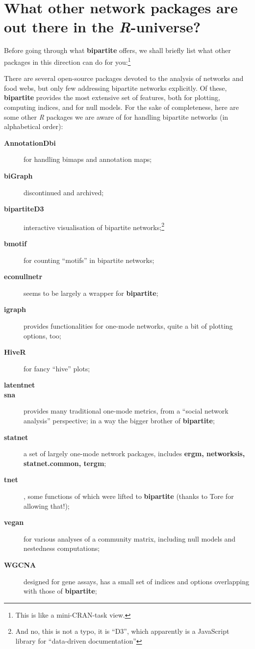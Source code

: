 \documentclass[a4paper, 11pt]{article}\usepackage[]{graphicx}\usepackage[]{color}
\newcommand{\package}[1]{\textbf{#1}}
\newcommand{\proglang}[1]{\textsl{#1}}
\begin{document}
\section{What other network packages are out there in the \proglang{R}-universe?}
Before going through what \package{bipartite} offers, we shall briefly list what other packages in this direction can do for you:\footnote{ This is like a mini-CRAN-task view.}

There are several open-source packages devoted to the analysis of networks and food webs, but only few addressing bipartite networks explicitly. Of these, \package{bipartite} provides the most extensive set of features, both for plotting, computing indices, and for null models. For the sake of completeness, here are some other \proglang{R} packages we are aware of for handling bipartite networks (in alphabetical order):
\begin{description}
\item[\package{AnnotationDbi}] for handling bimaps and annotation maps;
\item[\package{biGraph}] discontinued and archived;
\item[\package{bipartiteD3}] interactive visualisation of bipartite networks;\footnote{And no, this is not a typo, it is ``D3'', which apparently is a JavaScript library for ``data-driven documentation''}
\item[\package{bmotif}] for counting ``motifs'' in bipartite networks; 
\item[\package{econullnetr}] seems to be largely a wrapper for \package{bipartite};
\item[\package{igraph}] provides functionalities for one-mode networks, quite a bit of plotting options, too;
\item[\package{HiveR}] for fancy ``hive'' plots;
\item[\package{latentnet}] 
\item[\package{sna}] provides many traditional one-mode metrics, from a ``social network analysis'' perspective; in a way the bigger brother of \package{bipartite};
\item[\package{statnet}] a set of largely one-mode network packages, includes \package{ergm, networksis, statnet.common, tergm};
\item[\package{tnet}], some functions of which were lifted to \package{bipartite} (thanks to Tore for allowing that!);
\item[\package{vegan}] for various analyses of a community matrix, including null models and nestedness computations;
\item[\package{WGCNA}] designed for gene assays, has a small set of indices and options overlapping with those of \package{bipartite};
\end{description}
\end{document}
